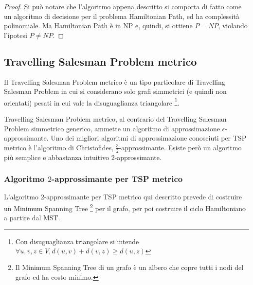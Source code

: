 \begin{proof}
    Si può notare che l'algoritmo appena descritto si comporta di fatto come un algoritmo di decisione per il problema Hamiltonian Path, ed ha complessità polinomiale.
    Ma Hamiltonian Path è in NP e, quindi, si ottiene $P = NP$, violando l'ipotesi $P \neq NP$.
\end{proof}

\subsection*{Travelling Salesman Problem metrico}
Il Travelling Salesman Problem metrico è un tipo particolare di Travelling Salesman Problem in cui si considerano solo grafi simmetrici (e quindi non orientati) pesati in cui vale la disuguaglianza triangolare \footnote{Con disuguaglianza triangolare si intende $\forall u, v, z \in V, d(u,v) + d(v,z) \ge d(u,z)$}.

Travelling Salesman Problem metrico, al contrario del Travelling Salesman Problem simmetrico generico, ammette un algoritmo di approssimazione $\epsilon$-approssimante. Uno dei migliori algoritmi di approssimazione conosciuti per TSP metrico è l'algoritmo di Christofides, $\frac{3}{2}$-approssimante.
Esiste però un algoritmo più semplice e abbastanza intuitivo $2$-approssimante.

\subsubsection{Algoritmo $2$-approssimante per TSP metrico}
L'algoritmo $2$-approssimante per TSP metrico qui descritto prevede di costruire un Minimum Spanning Tree \footnote{Il Minimum Spanning Tree di un grafo è un albero che copre tutti i nodi del grafo ed ha costo minimo.} per il grafo, per poi costruire il ciclo Hamiltoniano a partire dal MST.

